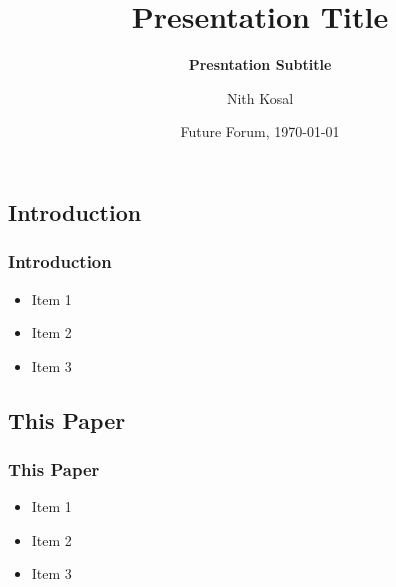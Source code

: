 \documentclass[11pt]{beamer}
\begin{document}
	\author[Nith Kosal]{Nith Kosal}
	\title[Presentation Title]{\bfseries Presentation Title}
	\subtitle{\bfseries Presntation Subtitle}
	\date[\today]{Future Forum, \today}
	\begin{frame}[plain]
		\maketitle
	\end{frame}
	
	\begin{frame}
		\section{Introduction}
		\frametitle{\bfseries Introduction}
		
		\begin{itemize}
			\item Item 1
			\item Item 2
			\item Item 3
		\end{itemize}
	\end{frame}
	
	\begin{frame}
		\section{This Paper}
		\frametitle{\bfseries This Paper}
		
		\begin{itemize}
			\item Item 1
			\item Item 2
			\item Item 3
		\end{itemize}
	\end{frame}
\end{document}

